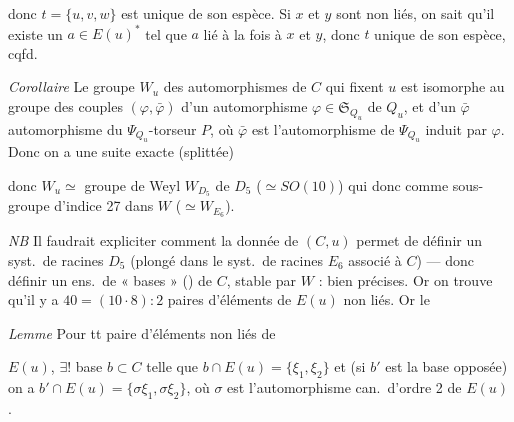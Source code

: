 \documentclass[11pt,a4paper]{article}
\begin{document}

donc $t = \lbrace u, v, w \rbrace$ est unique de son espèce. Si $x$ et $y$
sont non liés, on sait qu'il existe un  $a \in E(u)^{*}$
tel que $a$ lié à la fois à $x$ et $y$, donc $t$  unique de
son espèce, cqfd.

\emph{Corollaire} Le groupe \struck{\ill{}} $W_u$  des
automorphismes de $C$ qui fixent $u$ est \struck{\ill{}} isomorphe au groupe
des couples $(\varphi, \bar{\varphi})$ d'un automorphisme $\varphi \in
\mathfrak{S}_{Q_u}$ de $Q_u$, et d'un $\bar{\varphi}$ automorphisme du
\struck{\ill{}} $\Psi_{Q_u}$-torseur $P$, où $\bar{\varphi}$ est l'automorphisme
de $\Psi_{Q_u}$ induit par $\varphi$. Donc on a une suite exacte
(splittée)



donc $W_u \simeq$ groupe de Weyl $W_{D_5}$ de $D_5$ ($\simeq SO(10)$) qui
 donc comme sous-groupe d'indice 27 dans $W$ ($\simeq
W_{E_6}$).

\emph{NB} Il faudrait expliciter comment la donnée de $(C, u)$ permet de
définir un syst.\ de racines $D_5$ (plongé dans le syst.\ de racines $E_6$
associé à $C$) --- donc définir un ens.\ de  « bases » () de $C$, stable par $W$ : bien précises. Or on trouve qu'il y a $40 =
(10 \cdot 8) : 2$   paires
d'éléments de $E(u)$ non liés. Or \ill{} le

\emph{Lemme} Pour tt paire  d'éléments non
liés de


$E(u)$, $\exists!$ base $b \subset C$ telle que $b \cap E(u) = \lbrace \xi_1,
\xi_2 \rbrace$ et (si $b'$ est la base opposée) on a $b' \cap E(u) = \lbrace
\sigma\xi_1, \sigma\xi_2 \rbrace$, \struck{\ill{}} où $\sigma$ est
l'automorphisme can.\ d'ordre 2 de $E(u)$.

\end{document}
